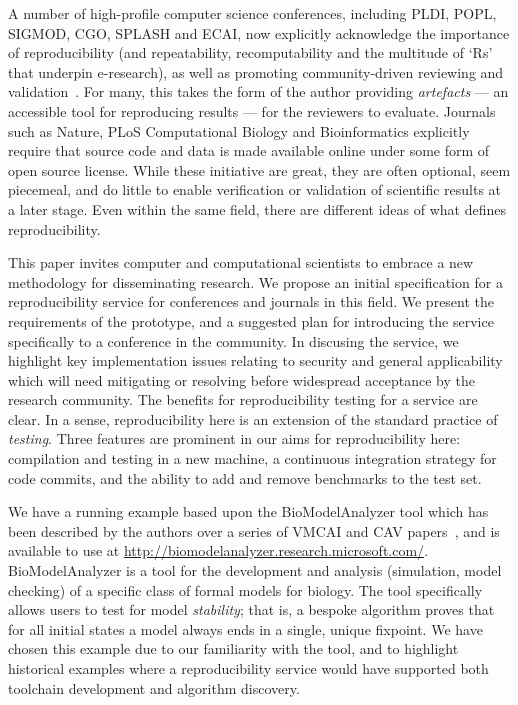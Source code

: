 \documentclass[conference]{IEEEtran}
\begin{document}
A number of high-profile computer science conferences, including PLDI,
POPL, SIGMOD, CGO, SPLASH and ECAI, now explicitly acknowledge the
importance of reproducibility (and repeatability, recomputability and
the multitude of `Rs' that underpin e-research), as well as promoting
community-driven reviewing and validation~\cite{fursin+dubach:2014}.
For many, this takes the form of the author providing \emph{artefacts} ---
an accessible tool for reproducing results --- for the reviewers to
evaluate. Journals such as Nature, PLoS Computational Biology and
Bioinformatics explicitly require that source code and data is made
available online under some form of open source license. While these
initiative are great, they are often optional, seem piecemeal, and do
little to enable verification or validation of scientific results at a
later stage. Even within the same field, there are different ideas of
what defines reproducibility.

This paper invites computer and computational scientists to embrace a new methodology
for disseminating research. We propose an initial specification for a
reproducibility service for conferences and journals in this field. We
present the requirements of the prototype, and a suggested plan for
introducing the service specifically to a conference in the
community. In discusing the service, we highlight key implementation
issues relating to security and general applicability which will need
mitigating or resolving before widespread acceptance by the research
community.  The benefits for reproducibility testing for a service are
clear. In a sense, reproducibility here is an extension of the
standard practice of \emph{testing}.  Three features are prominent in our
aims for reproducibility here: compilation and testing in a new
machine, a continuous integration strategy for code commits, and the
ability to add and remove benchmarks to the test set.

We have a running example based upon the BioModelAnalyzer tool which
has been described by the authors over a series of VMCAI and CAV
papers~\cite{cook-et-al:2011,benque-et-al:2012,cook-et-al:2014}, 
and is available to use at
\url{http://biomodelanalyzer.research.microsoft.com/}.
BioModelAnalyzer is a tool for the development and analysis
(simulation, model checking) of a specific class of formal models for
biology. The tool specifically allows users to test for model
\emph{stability}; that is, a bespoke algorithm proves that for all
initial states a model always ends in a single, unique fixpoint. We have
chosen this example due to our familiarity with the tool, and to
highlight historical examples where a reproducibility service would
have supported both toolchain development and algorithm discovery.
\end{document}
